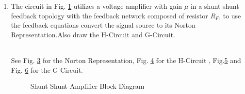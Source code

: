 \begin{enumerate}[label=\thesection.\arabic*.,ref=\thesection.\theenumi]

\item The circuit in Fig. \ref{fig:ee18btech11011_original_circuit} utilizes a voltage amplifier with gain $\mu$ in a shunt-shunt feedback topology with the feedback network composed of resistor $R_F$, to use the feedback equations convert the signal source to its Norton Representation.Also draw the H-Circuit and G-Circuit. 
\renewcommand{\thefigure}{\theenumi.\arabic{figure}}
%
\begin{figure}[!ht]
	\begin{center}
		
		\resizebox{\columnwidth}{!}{}
	\end{center}
\caption{}
\label{fig:ee18btech11011_original_circuit}
\end{figure}
%
\\
\solution  See Fig. \ref{fig:ee18btech11011_Norton_Representation} for the Norton Representation, Fig. \ref{fig:ee18btech11011_beta_circuit} for the H-Circuit , Fig.\ref{fig:ee18btech11011_A1_circuit} and Fig. \ref{fig:ee18btech11011_A2_circuit} for the G-Circuit. 
%
\begin{figure}[!ht]
	\begin{center}
			\resizebox{\columnwidth}{!}{}
	\end{center}
\caption{Shunt Shunt Amplifier Block Diagram}
\label{fig:Shunt_Shunt_Amplifier_Block_Diagram}
\end{figure}
%
\begin{figure}[!ht]
	\begin{center}
			\resizebox{\columnwidth}{!}{}
	\end{center}
\caption{}
\label{fig:ee18btech11011_Norton_Representation}
\end{figure}
%
\begin{figure}[!ht]
	\begin{center}
			\resizebox{\columnwidth}{!}{}
	\end{center}
\caption{}
\label{fig:ee18btech11011_beta_circuit}
\end{figure}
%
\begin{figure}[!ht]
	\begin{center}
			\resizebox{\columnwidth}{!}{}
	\end{center}
\caption{}
\label{fig:ee18btech11011_A1_circuit}
\end{figure}
%
\begin{figure}[!ht]
	\begin{center}
			\resizebox{\columnwidth}{!}{}
	\end{center}
\caption{}
\label{fig:ee18btech11011_A2_circuit}
\end{figure}


\end{enumerate}

